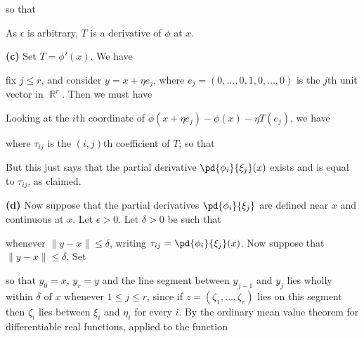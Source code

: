 {

\noindent so that


\noindent As $\epsilon$ is arbitrary, $T$ is a derivative of $\phi$ at
$x$.

\medskip

{\bf (c)} Set $T=\phi'(x)$.   We have


\noindent fix $j\le r$, and consider $y=x+\eta e_j$, where
$e_j=(0,\ldots,0,1,0,\ldots,0)$ is the $j$th unit vector in $\BbbR^r$.
Then we must have


\noindent Looking at the $i$th coordinate of
$\phi(x+\eta e_j)-\phi(x)-\eta T(e_j)$, we have



\noindent where $\tau_{ij}$ is the
$(i,j)$th coefficient of $T$;  so that


\noindent  But this just says that the partial derivative
$\pd{\phi_i}{\xi_j}(x)$ exists and is equal to $\tau_{ij}$, as claimed.

\medskip

{\bf (d)} Now suppose that the partial derivatives $\pd{\phi_i}{\xi_j}$
are defined near $x$ and continuous at $x$.   Let $\epsilon>0$.   Let
$\delta>0$ be such that


\noindent whenever $\|y-x\|\le\delta$, writing
$\tau_{ij}=\pd{\phi_i}{\xi_j}(x)$.   Now suppose that
$\|y-x\|\le\delta$.   Set



\noindent so that $y_0=x$, $y_r=y$ and the line segment between
$y_{j-1}$ and $y_{j}$ lies wholly within $\delta$ of $x$ whenever
$1\le j\le r$, since if $z=(\zeta_1,\ldots,\zeta_r)$
lies on this segment then $\zeta_i$ lies
between $\xi_i$ and $\eta_i$ for every $i$.   By the ordinary mean value
theorem for differentiable real functions, applied to the function

}
